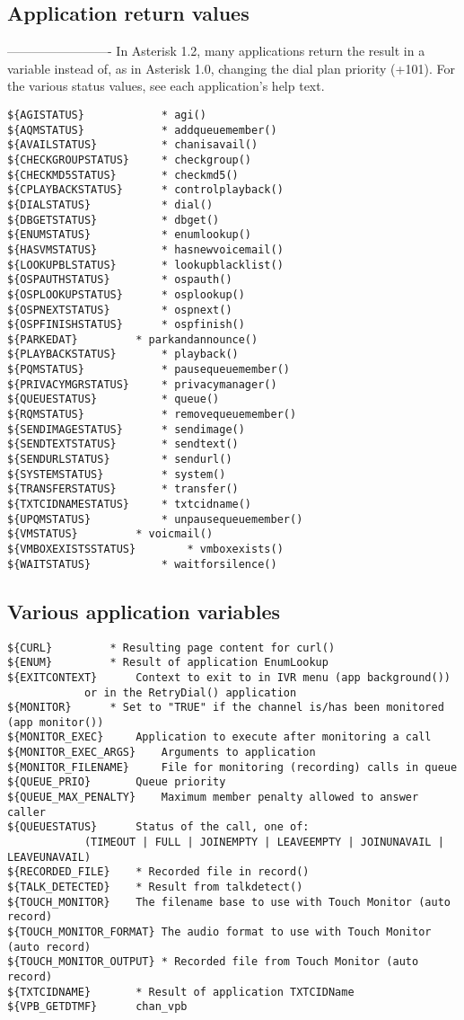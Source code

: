 \subsection{Application return values}
-------------------------
In Asterisk 1.2, many applications return the result in a variable
instead of, as in Asterisk 1.0, changing the dial plan priority (+101).
For the various status values, see each application's help text.
\begin{verbatim}
${AGISTATUS}			* agi()
${AQMSTATUS}			* addqueuemember()
${AVAILSTATUS}			* chanisavail()
${CHECKGROUPSTATUS}		* checkgroup()
${CHECKMD5STATUS}		* checkmd5()
${CPLAYBACKSTATUS}		* controlplayback()
${DIALSTATUS}   		* dial()
${DBGETSTATUS}			* dbget()
${ENUMSTATUS}			* enumlookup()
${HASVMSTATUS}			* hasnewvoicemail()
${LOOKUPBLSTATUS}		* lookupblacklist()
${OSPAUTHSTATUS}		* ospauth()
${OSPLOOKUPSTATUS}		* osplookup()
${OSPNEXTSTATUS}		* ospnext()
${OSPFINISHSTATUS}		* ospfinish()
${PARKEDAT}			* parkandannounce()
${PLAYBACKSTATUS}		* playback()
${PQMSTATUS}			* pausequeuemember()
${PRIVACYMGRSTATUS}		* privacymanager()
${QUEUESTATUS}			* queue()
${RQMSTATUS}			* removequeuemember()
${SENDIMAGESTATUS}		* sendimage()
${SENDTEXTSTATUS}		* sendtext()
${SENDURLSTATUS}		* sendurl()
${SYSTEMSTATUS}			* system()
${TRANSFERSTATUS}		* transfer()
${TXTCIDNAMESTATUS}		* txtcidname()
${UPQMSTATUS}			* unpausequeuemember()
${VMSTATUS}			* voicmail()
${VMBOXEXISTSSTATUS}		* vmboxexists()
${WAITSTATUS}			* waitforsilence()
\end{verbatim}

\subsection{Various application variables}
\begin{verbatim}
${CURL}			* Resulting page content for curl()
${ENUM}			* Result of application EnumLookup
${EXITCONTEXT}		Context to exit to in IVR menu (app background())
			or in the RetryDial() application
${MONITOR}		* Set to "TRUE" if the channel is/has been monitored (app monitor())
${MONITOR_EXEC}		Application to execute after monitoring a call
${MONITOR_EXEC_ARGS}	Arguments to application
${MONITOR_FILENAME} 	File for monitoring (recording) calls in queue
${QUEUE_PRIO}		Queue priority
${QUEUE_MAX_PENALTY}	Maximum member penalty allowed to answer caller
${QUEUESTATUS} 		Status of the call, one of:
			(TIMEOUT | FULL | JOINEMPTY | LEAVEEMPTY | JOINUNAVAIL | LEAVEUNAVAIL)
${RECORDED_FILE} 	* Recorded file in record()
${TALK_DETECTED} 	* Result from talkdetect()
${TOUCH_MONITOR} 	The filename base to use with Touch Monitor (auto record)
${TOUCH_MONITOR_FORMAT} The audio format to use with Touch Monitor (auto record)
${TOUCH_MONITOR_OUTPUT} * Recorded file from Touch Monitor (auto record)
${TXTCIDNAME}		* Result of application TXTCIDName
${VPB_GETDTMF}		chan_vpb
\end{verbatim}

